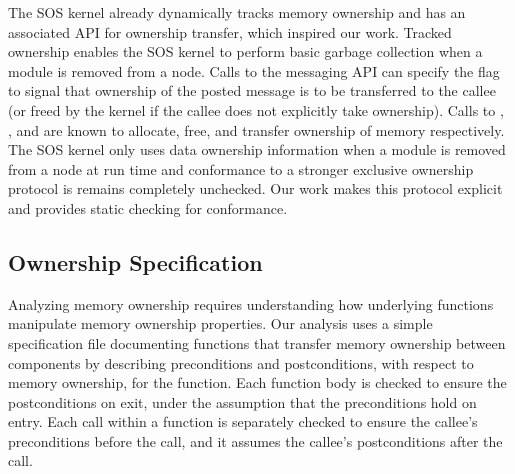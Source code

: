 The SOS kernel already dynamically tracks memory ownership and has an
associated API for ownership transfer, which inspired our work.  
%
Tracked ownership enables the SOS kernel to perform basic garbage collection
when a module is removed from a node.
%
Calls to the messaging API can specify the  flag to
signal that ownership of the posted message is to be transferred to the
callee (or freed by the kernel if the callee does not explicitly take
ownership).  
%
Calls to , , and
 are known to allocate, free, and transfer
ownership of memory respectively.
%
The SOS kernel only uses data ownership information when a module is removed
from a node at run time and conformance to a stronger exclusive ownership
protocol is remains completely unchecked.
%
Our work makes this protocol explicit and provides static checking for
conformance.



\subsection{Ownership Specification}


%  
%  



Analyzing memory ownership requires understanding how underlying functions
manipulate memory ownership properties.
%
Our analysis uses a simple specification file documenting functions that
transfer memory ownership between components by describing preconditions and
postconditions, with respect to memory ownership, for the function.
%
Each function body is checked to ensure the postconditions on exit, under
the assumption that the preconditions hold on entry.  
%
Each call within a function is separately checked to ensure the callee's
preconditions before the call, and it assumes the callee's postconditions
after the call.



